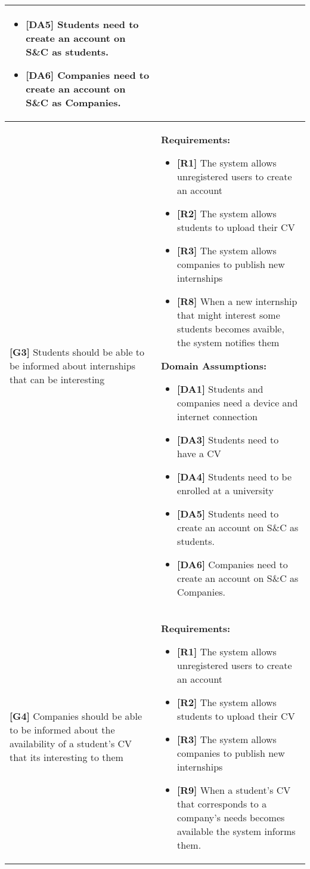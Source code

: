 \begin{longtable}{|p{}|p{}|}
\begin{itemize}
    \item \textbf{[DA5]} Students need to create an account on S\&C as students.
    \item \textbf{[DA6]} Companies need to create an account on S\&C as Companies.
\end{itemize} \\
\hline
\textbf{[G3]} Students should be able to be informed about internships that can be interesting 
& 
\textbf{Requirements:}
\begin{itemize}
    \item \textbf{[R1]} The system allows unregistered users to create an account
    \item \textbf{[R2]} The system allows students to upload their CV
    \item \textbf{[R3]} The system allows companies to publish new internships
    \item \textbf{[R8]} When a new internship that might interest some students becomes avaible, the system notifies them
\end{itemize}
\textbf{Domain Assumptions:}
\begin{itemize}
      \item \textbf{[DA1]} Students and companies need a device and internet connection
    \item \textbf{[DA3]} Students need to have a CV
     \item \textbf{[DA4]} Students need to be enrolled at a university
    \item \textbf{[DA5]} Students need to create an account on S\&C as students.
    \item \textbf{[DA6]} Companies need to create an account on S\&C as Companies.
\end{itemize} \\
\hline
\textbf{[G4]} Companies should be able to be informed about the availability of a student's CV that its interesting to them
& 
\textbf{Requirements:}
\begin{itemize}
    \item \textbf{[R1]} The system allows unregistered users to create an account
    \item \textbf{[R2]} The system allows students to upload their CV
    \item \textbf{[R3]} The system allows companies to publish new internships
    \item \textbf{[R9]} When a student’s CV that corresponds to a company’s needs becomes available the system informs them.
\end{itemize}

\end{longtable}
